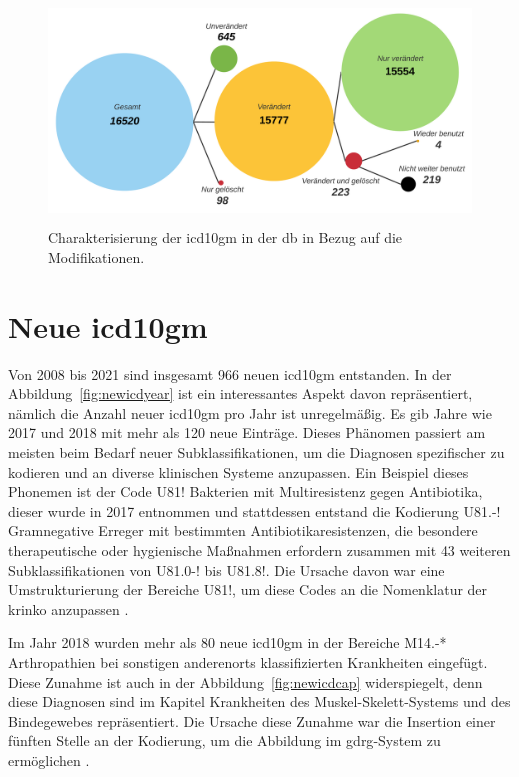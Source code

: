  \begin{figure}[ht]
 	\centering
 	\includegraphics[height=6cm]{figures/icd10gm_quantities}
 	\caption[\acs{icd10gm} in der \acs{db}]{Charakterisierung der \acs{icd10gm} in der \ac{db} in Bezug auf die Modifikationen.}
 	\label{fig:icddb}
 \end{figure}

\section{Neue \acs{icd10gm}} \label{sec:newicd}

Von 2008 bis 2021 sind insgesamt \textsf{966} neuen \ac{icd10gm} entstanden. In der Abbildung~\ref{fig:newicdyear} ist ein interessantes Aspekt davon repräsentiert, nämlich die Anzahl neuer \ac{icd10gm} pro Jahr ist unregelmäßig. Es gib Jahre wie 2017 und 2018 mit mehr als \textsf{120} neue Einträge. Dieses Phänomen passiert am meisten beim Bedarf neuer Subklassifikationen, um die Diagnosen spezifischer zu kodieren und an diverse klinischen Systeme anzupassen. Ein Beispiel dieses Phonemen ist der Code \textsf{U81!} \textsf{Bakterien mit Multiresistenz gegen Antibiotika}, dieser wurde in 2017 entnommen und stattdessen entstand die Kodierung \textsf{U81.-!} \textsf{Gramnegative Erreger mit bestimmten Antibiotikaresistenzen, die besondere therapeutische oder hygienische Maßnahmen erfordern} zusammen mit \textsf{43} weiteren Subklassifikationen von \textsf{U81.0-!} bis \textsf{U81.8!}. Die Ursache davon war eine Umstrukturierung der Bereiche \textsf{U81!}, um diese Codes an die Nomenklatur der \ac{krinko} anzupassen \cite{erreg17}.

Im Jahr 2018 wurden mehr als \textsf{80} neue \ac{icd10gm} in der Bereiche \textsf{M14.-*} \textsf{Arthropathien bei sonstigen anderenorts klassifizierten Krankheiten} eingefügt. Diese Zunahme ist auch in der Abbildung~\ref{fig:newicdcap} widerspiegelt, denn diese Diagnosen sind im Kapitel \textsf{Krankheiten des Muskel-Skelett-Systems und des Bindegewebes} repräsentiert. Die Ursache diese Zunahme war die Insertion einer fünften Stelle an der Kodierung, um die Abbildung im \ac{gdrg}-System zu ermöglichen \cite{musk18}.

